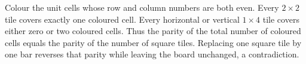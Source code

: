 Colour the unit cells whose row and column numbers are both even. Every $2\times2$ tile covers exactly one coloured cell. Every horizontal or vertical $1\times4$ tile covers either zero or two coloured cells. Thus the parity of the total number of coloured cells equals the parity of the number of square tiles. Replacing one square tile by one bar reverses that parity while leaving the board unchanged, a contradiction.

